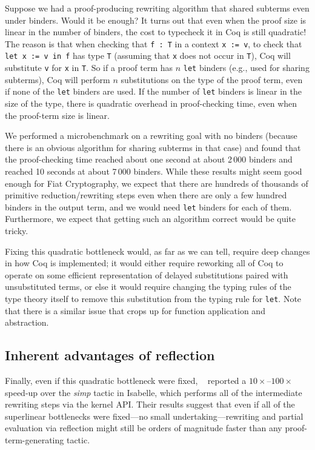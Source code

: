 \documentclass[a4paper,USenglish,cleveref,autoref,thm-restate]{lipics-v2021}
\newcommand{\citet}[1]{\usebibentry{#1}{citet}~\cite{#1}}
\begin{document}
Suppose we had a proof-producing rewriting algorithm that shared subterms even under binders.
Would it be enough?
It turns out that even when the proof size is linear in the number of binders, the cost to typecheck it in Coq is still quadratic!
The reason is that when checking that \texttt{f : T} in a context \texttt{x := v}, to check that \texttt{let x := v in f} has type \texttt{T} (assuming that \texttt{x} does not occur in \texttt{T}), Coq will substitute \texttt{v} for \texttt{x} in \texttt{T}.
So if a proof term has $n$ \texttt{let} binders (e.g., used for sharing subterms), Coq will perform $n$ substitutions on the type of the proof term, even if none of the \texttt{let} binders are used.
If the number of \texttt{let} binders is linear in the size of the type, there is quadratic overhead in proof-checking time, even when the proof-term size is linear.

We performed a microbenchmark on a rewriting goal with no binders (because there is an obvious algorithm for sharing subterms in that case) and found that the proof-checking time reached about one second at about 2\,000 binders and reached 10 seconds at about 7\,000 binders.
While these results might seem good enough for Fiat Cryptography, we expect that there are hundreds of thousands of primitive reduction/rewriting steps even when there are only a few hundred binders in the output term, and we would need \texttt{let} binders for each of them.
Furthermore, we expect that getting such an algorithm correct would be quite tricky.

Fixing this quadratic bottleneck would, as far as we can tell, require deep changes in how Coq is implemented; it would either require reworking all of Coq to operate on some efficient representation of delayed substitutions paired with unsubstituted terms, or else it would require changing the typing rules of the type theory itself to remove this substitution from the typing rule for \texttt{let}.
Note that there is a similar issue that crops up for function application and abstraction.

\subsection{Inherent advantages of reflection}

Finally, even if this quadratic bottleneck were fixed, \citet{Aehlig} reported a $10\times$--$100\times$ speed-up over the \emph{simp} tactic in Isabelle, which performs all of the intermediate rewriting steps via the kernel API.
Their results suggest that even if all of the superlinear bottlenecks were fixed---no small undertaking---rewriting and partial evaluation via reflection might still be orders of magnitude faster than any proof-term-generating tactic.
\end{document}
